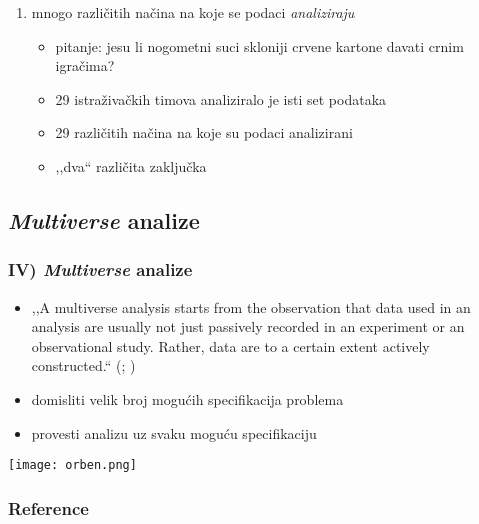 \documentclass{beamer}
\newcounter{saveenumi}
\newcommand{\conti}{\setcounter{enumi}{\value{saveenumi}}}
\newcommand{\tinycitep}[1]{%
    \bgroup
    \scriptsize
    \citep{#1}
    \egroup}
\begin{document}
\begin{frame}
    \begin{enumerate}
        \conti

        \item mnogo različitih načina na koje se podaci \emph{analiziraju}
            \tinycitep{silberzahnManyAnalystsOne2018}

            \begin{itemize}
                \item pitanje: jesu li nogometni suci skloniji crvene kartone
                    davati crnim igračima?

                \pause

                \item 29 istraživačkih timova analiziralo je isti set
                    podataka

                \pause

                \item 29 različitih načina na koje su podaci analizirani

                \pause

                \item ,,dva`` različita zaključka
            \end{itemize}

    \end{enumerate}
\end{frame}

\subsection{\textit{Multiverse} analize}

\begin{frame}
    \frametitle{IV) \textit{Multiverse} analize}

    \begin{itemize}
        \item ,,A multiverse analysis starts from the observation that data used
            in an analysis are usually not just passively recorded in an
            experiment or an observational study.  Rather, data are to a certain
            extent actively constructed.``
            \bgroup
            \scriptsize
            (\citealp*[p. 702]{steegenIncreasingTransparencyMultiverse2016};
            \citealp*[za sličan pristup
            vidi][]{simonsohnSpecificationCurveDescriptive2015})
            \egroup

        \pause

        \item domisliti velik broj mogućih specifikacija problema

        \item provesti analizu uz svaku moguću specifikaciju

    \end{itemize}

\end{frame}

\begin{frame}
    \centering
    \texttt{[image: orben.png]}
\end{frame}


\begin{frame}[allowframebreaks]
    \frametitle{Reference}

    
    
\end{frame}
\end{document}
